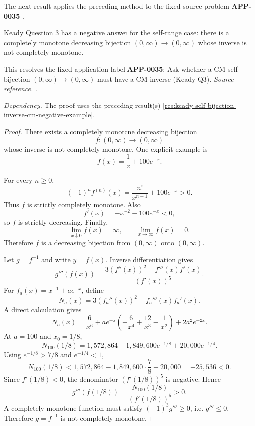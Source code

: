 The next result applies the preceding method to the fixed source problem \textbf{APP-0035} \cite{app-app-0035-source}.
\begin{counterexample}
\label{res:keady-q3-self-bijection-inverse-cm-negative-answer}
Keady Question 3 has a negative answer for the self-range case: there is a completely monotone decreasing bijection \((0,\infty)\to(0,\infty)\) whose inverse is not completely monotone.

This resolves the fixed application label \textbf{APP-0035}: Ask whether a CM self-bijection \((0,\infty)\to(0,\infty)\) must have a CM inverse (Keady Q3).
\emph{Source reference.} \cite{app-app-0035-source}.

\emph{Dependency.} The proof uses the preceding result(s) \ref{res:keady-self-bijection-inverse-cm-negative-example}.
\end{counterexample}
\begin{proof}
There exists a completely monotone decreasing bijection
\[
f:(0,\infty)\to(0,\infty)
\]
whose inverse is not completely monotone. One explicit example is
\[
f(x)=\frac1x+100e^{-x}.
\]

For every \(n\ge0\),
\[
(-1)^n f^{(n)}(x)=\frac{n!}{x^{n+1}}+100e^{-x}>0.
\]
Thus \(f\) is strictly completely monotone. Also
\[
f'(x)=-x^{-2}-100e^{-x}<0,
\]
so \(f\) is strictly decreasing. Finally,
\[
\lim_{x\downarrow0}f(x)=\infty,
\qquad
\lim_{x\to\infty}f(x)=0.
\]
Therefore \(f\) is a decreasing bijection from \((0,\infty)\) onto \((0,\infty)\).

Let \(g=f^{-1}\) and write \(y=f(x)\). Inverse differentiation gives
\[
g'''(f(x))=\frac{3(f''(x))^2-f'''(x)f'(x)}{(f'(x))^5}.
\]
For \(f_a(x)=x^{-1}+ae^{-x}\), define
\[
N_a(x)=3(f_a''(x))^2-f_a'''(x)f_a'(x).
\]
A direct calculation gives
\[
N_a(x)=\frac6{x^6}+ae^{-x}\left(-\frac6{x^4}+\frac{12}{x^3}-\frac1{x^2}\right)+2a^2e^{-2x}.
\]
At \(a=100\) and \(x_0=1/8\),
\[
N_{100}(1/8)=1{,}572{,}864-1{,}849{,}600e^{-1/8}+20{,}000e^{-1/4}.
\]
Using \(e^{-1/8}>7/8\) and \(e^{-1/4}<1\),
\[
N_{100}(1/8)<1{,}572{,}864-1{,}849{,}600\cdot\frac78+20{,}000=-25{,}536<0.
\]
Since \(f'(1/8)<0\), the denominator \((f'(1/8))^5\) is negative. Hence
\[
g'''(f(1/8))=\frac{N_{100}(1/8)}{(f'(1/8))^5}>0.
\]
A completely monotone function must satisfy \((-1)^3g'''\ge0\), i.e. \(g'''\le0\). Therefore \(g=f^{-1}\) is not completely monotone.
\end{proof}

\appendix
